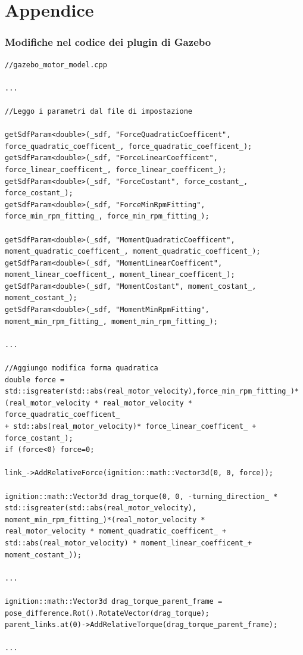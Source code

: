 \chapter{Appendice}
\subsection{Modifiche nel codice dei plugin di Gazebo}

\lstset{language=c++}
\begin{lstlisting}
//gazebo_motor_model.cpp

...

//Leggo i parametri dal file di impostazione

getSdfParam<double>(_sdf, "ForceQuadraticCoefficent", force_quadratic_coefficent_, force_quadratic_coefficent_);
getSdfParam<double>(_sdf, "ForceLinearCoefficent", force_linear_coefficent_, force_linear_coefficent_);
getSdfParam<double>(_sdf, "ForceCostant", force_costant_, force_costant_);
getSdfParam<double>(_sdf, "ForceMinRpmFitting", force_min_rpm_fitting_, force_min_rpm_fitting_);

getSdfParam<double>(_sdf, "MomentQuadraticCoefficent", moment_quadratic_coefficent_, moment_quadratic_coefficent_);
getSdfParam<double>(_sdf, "MomentLinearCoefficent", moment_linear_coefficent_, moment_linear_coefficent_);
getSdfParam<double>(_sdf, "MomentCostant", moment_costant_, moment_costant_);
getSdfParam<double>(_sdf, "MomentMinRpmFitting", moment_min_rpm_fitting_, moment_min_rpm_fitting_);

...

//Aggiungo modifica forma quadratica
double force = std::isgreater(std::abs(real_motor_velocity),force_min_rpm_fitting_)*
(real_motor_velocity * real_motor_velocity * force_quadratic_coefficent_ 
+ std::abs(real_motor_velocity)* force_linear_coefficent_ + force_costant_);
if (force<0) force=0;

link_->AddRelativeForce(ignition::math::Vector3d(0, 0, force));

ignition::math::Vector3d drag_torque(0, 0, -turning_direction_ *
std::isgreater(std::abs(real_motor_velocity),
moment_min_rpm_fitting_)*(real_motor_velocity * 
real_motor_velocity * moment_quadratic_coefficent_ + 
std::abs(real_motor_velocity) * moment_linear_coefficent_+ moment_costant_));

...

ignition::math::Vector3d drag_torque_parent_frame = pose_difference.Rot().RotateVector(drag_torque);
parent_links.at(0)->AddRelativeTorque(drag_torque_parent_frame);

...

\end{lstlisting}

